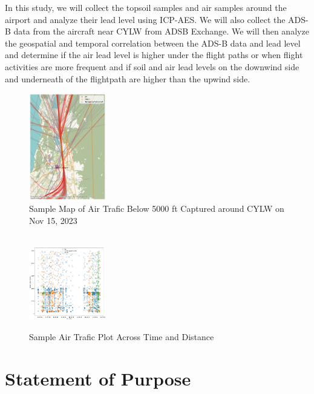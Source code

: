 \documentclass[12pt]{article}
\begin{document}
In this study, we will collect the topsoil samples and air samples around the airport and analyze their lead level using ICP-AES. We will also collect the ADS-B data from the aircraft near CYLW from ADSB Exchange\cite{adsbexchange}. We will then analyze the geospatial and temporal correlation between the ADS-B data and lead level and determine if the air lead level is higher under the flight paths or when flight activities are more frequent and if soil and air lead levels on the downwind side and underneath of the flightpath are higher than the upwind side. 
\setlength\intextsep{-2pt}
\begin{figure}
  \begin{center}
    \includegraphics[width=0.3\textwidth]{map.png} \\
  \caption{\small{Sample Map of Air Trafic Below 5000 ft Captured around CYLW on Nov 15, 2023}}
      \label{fig:map}\\

          \includegraphics[width=0.3\textwidth]{time.png} \\
  \caption{\small{Sample Air Trafic Plot Across Time and Distance}}
      \label{fig:time}
  \end{center}
\vspace{-20pt}
\end{figure}
\section{Statement of Purpose}
\end{document}
